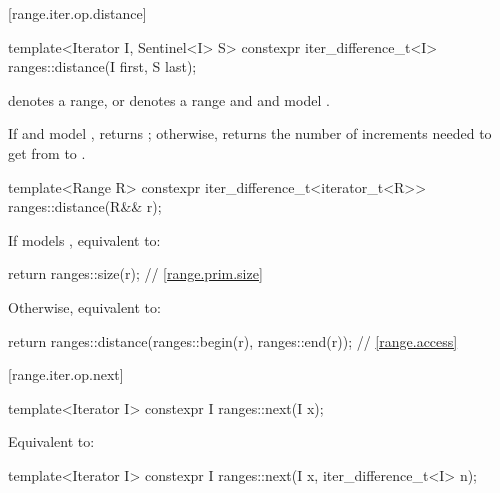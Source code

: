 [range.iter.op.distance]{}
%
\begin{itemdecl}
template<Iterator I, Sentinel<I> S>
  constexpr iter_difference_t<I> ranges::distance(I first, S last);
\end{itemdecl}

\begin{itemdescr}
\pnum
\expects
{} denotes a range, or
 denotes a range and
 and  model
.

\pnum
\effects
If  and  model ,
returns ;
otherwise, returns the number of increments needed to get from
to
.
\end{itemdescr}

%
\begin{itemdecl}
template<Range R>
  constexpr iter_difference_t<iterator_t<R>> ranges::distance(R&& r);
\end{itemdecl}

\begin{itemdescr}
\pnum
\effects
If  models , equivalent to:
\begin{codeblock}
return ranges::size(r);                                         // \ref{range.prim.size}
\end{codeblock}
Otherwise, equivalent to:
\begin{codeblock}
return ranges::distance(ranges::begin(r), ranges::end(r));      // \ref{range.access}
\end{codeblock}
\end{itemdescr}

[range.iter.op.next]{}

%
\begin{itemdecl}
template<Iterator I>
  constexpr I ranges::next(I x);
\end{itemdecl}

\begin{itemdescr}
\pnum
\effects Equivalent to: 
\end{itemdescr}

%
\begin{itemdecl}
template<Iterator I>
  constexpr I ranges::next(I x, iter_difference_t<I> n);
\end{itemdecl}

